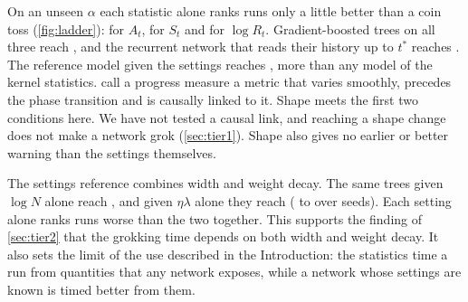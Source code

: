 \documentclass[a4paper,11pt]{article} %
\newcommand{\tstar}{t^{\ast}}
\begin{document}
On an unseen $\alpha$ each statistic alone ranks runs only a little better
than a coin toss (\cref{fig:ladder}): \EeightAonly{} for $A_t$, \EeightSonly{}
for $S_t$ and \EeightRonly{} for $\log R_t$. Gradient-boosted trees on all three
reach \EeightXgb{}, and the recurrent network that reads their history up to
$\tstar$ reaches \EeightGru. The reference model given the settings reaches
\EeightRef, more than any model of the kernel statistics.
 call a progress
measure a metric that varies smoothly, precedes the phase transition and is
causally linked to it. Shape meets the first two conditions here. We have not
tested a causal link, and reaching a shape change does not make a
network grok (\cref{sec:tier1}). Shape also gives no earlier or better warning
than the settings themselves.

The settings reference combines width and weight decay. The same trees given
$\log N$ alone reach \EeightWidthref{}, and given $\eta\lambda$ alone they reach
\EeightDecayref{} (\EeightDecayrefLo{} to \EeightDecayrefHi{} over seeds). Each
setting alone ranks runs worse than the two together. This supports
the finding of \cref{sec:tier2} that the grokking time depends on both
width and weight decay. It also sets the limit of the use described in the
Introduction: the statistics time a run from quantities that any network
exposes, while a network whose settings are known is timed better from them.

\end{document}
